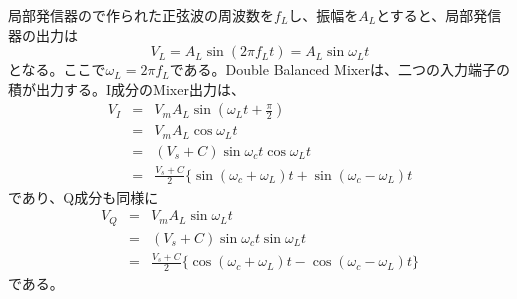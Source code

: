 局部発信器ので作られた正弦波の周波数を$f_L$し、振幅を$A_L$とすると、局部発信器の出力は
\begin{equation}
V_L = A_L \sin(2 \pi f_L t) = A_L \sin\omega_Lt
\end{equation}
となる。ここで$\omega_L = 2\pi f_L$である。Double Balanced Mixerは、二つの入力端子の積が出力する。I成分のMixer出力は、
\begin{eqnarray}
V_I &=& V_mA_L\sin(\omega_Lt + \frac{\pi}{2}) \nonumber\\
&=& V_mA_L\cos\omega_Lt \nonumber\\
&=& (V_s + C)\sin\omega_ct\cos\omega_Lt \nonumber\\
&=& \frac{V_s + C}{2}\{\sin(\omega_c + \omega_L)t + \sin(\omega_c - \omega_L)t \label{eq:AM_I}
\end{eqnarray}
であり、Q成分も同様に
\begin{eqnarray}
V_Q &=& V_mA_L\sin\omega_Lt \nonumber\\
&=& (V_s + C)\sin\omega_ct\sin\omega_Lt \nonumber\\
&=& \frac{V_s + C}{2}\{\cos(\omega_c + \omega_L)t - \cos(\omega_c - \omega_L)t \}\label{eq:AM_Q}
\end{eqnarray}
である。
